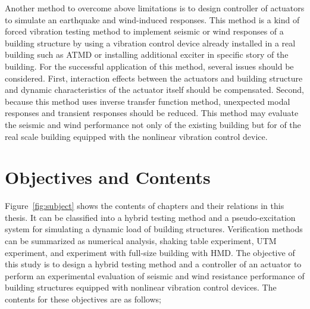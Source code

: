 Another method to overcome above limitations is to design controller of actuators to simulate an earthquake and wind-induced responses. This method is a kind of forced vibration testing method to implement seismic or wind responses of a building structure by using a vibration control device already installed in a real building such as ATMD or installing additional exciter in specific story of the building. For the successful application of this method, several issues should be considered. First, interaction effects between the actuators and building structure and dynamic characteristics of the actuator itself should be compensated. Second, because this method uses inverse transfer function method, unexpected modal responses and transient responses should be reduced. This method may evaluate the seismic and wind performance not only of the existing building but for of the real scale building equipped with the nonlinear vibration control device.


\section{Objectives and Contents}
Figure~\ref{fig:subject} shows the contents of chapters and their relations in this thesis. It can be classified into a hybrid testing method and a pseudo-excitation system for simulating a dynamic load of building structures. Verification methods can be summarized as numerical analysis, shaking table experiment, UTM experiment, and experiment with full-size building with HMD. The objective of this study is to design a hybrid testing method and a controller of an actuator to perform an experimental evaluation of seismic and wind resistance performance of building structures equipped with nonlinear vibration control devices. The contents for these objectives are as follows;

